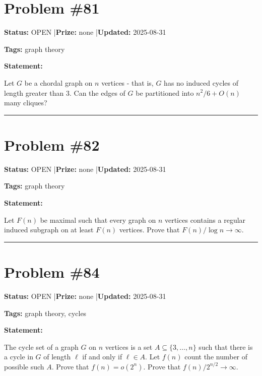 \documentclass{article}
\begin{document}
\section{Problem \#81}
\label{prob:81}

\noindent\textbf{Status:} OPEN \quad|\quad \textbf{Prize:} none \quad|\quad \textbf{Updated:} 2025-08-31

\noindent\textbf{Tags:} graph theory

\medskip

\noindent\textbf{Statement:}

Let $G$ be a chordal graph on $n$ vertices - that is, $G$ has no induced cycles of length greater than $3$. Can the edges of $G$ be partitioned into $n^2/6+O(n)$ many cliques?

\noindent\rule{\linewidth}{0.4pt}


\section{Problem \#82}
\label{prob:82}

\noindent\textbf{Status:} OPEN \quad|\quad \textbf{Prize:} none \quad|\quad \textbf{Updated:} 2025-08-31

\noindent\textbf{Tags:} graph theory

\medskip

\noindent\textbf{Statement:}

Let $F(n)$ be maximal such that every graph on $n$ vertices contains a regular induced subgraph on at least $F(n)$ vertices. Prove that $F(n)/\log n\to \infty$.

\noindent\rule{\linewidth}{0.4pt}


\section{Problem \#84}
\label{prob:84}

\noindent\textbf{Status:} OPEN \quad|\quad \textbf{Prize:} none \quad|\quad \textbf{Updated:} 2025-08-31

\noindent\textbf{Tags:} graph theory, cycles

\medskip

\noindent\textbf{Statement:}

The cycle set of a graph $G$ on $n$ vertices is a set $A\subseteq \{3,\ldots,n\}$ such that there is a cycle in $G$ of length $\ell$ if and only if $\ell \in A$. Let $f(n)$ count the number of possible such $A$. Prove that $f(n)=o(2^n)$. Prove that $f(n)/2^{n/2}\to \infty$.
\end{document}

